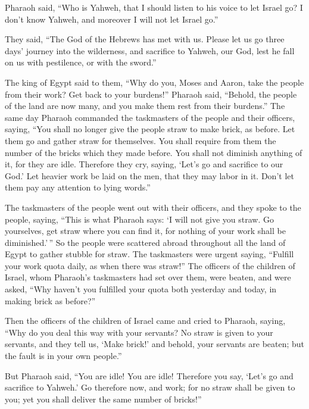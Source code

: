  Pharaoh said, ``Who is Yahweh, that I should listen to
his voice to let Israel go? I don't know Yahweh, and moreover I will not
let Israel go.''

 They said, ``The God of the Hebrews has met with us.
Please let us go three days' journey into the wilderness, and sacrifice
to Yahweh, our God, lest he fall on us with pestilence, or with the
sword.''

 The king of Egypt said to them, ``Why do you, Moses and
Aaron, take the people from their work? Get back to your burdens!''
 Pharaoh said, ``Behold, the people of the land are now
many, and you make them rest from their burdens.''  The
same day Pharaoh commanded the taskmasters of the people and their
officers, saying,  ``You shall no longer give the people
straw to make brick, as before. Let them go and gather straw for
themselves.  You shall require from them the number of the
bricks which they made before. You shall not diminish anything of it,
for they are idle. Therefore they cry, saying, `Let's go and sacrifice
to our God.'  Let heavier work be laid on the men, that
they may labor in it. Don't let them pay any attention to lying words.''

 The taskmasters of the people went out with their
officers, and they spoke to the people, saying, ``This is what Pharaoh
says: `I will not give you straw.  Go yourselves, get
straw where you can find it, for nothing of your work shall be
diminished.'\,''  So the people were scattered abroad
throughout all the land of Egypt to gather stubble for straw.
 The taskmasters were urgent saying, ``Fulfill your work
quota daily, as when there was straw!''  The officers of
the children of Israel, whom Pharaoh's taskmasters had set over them,
were beaten, and were asked, ``Why haven't you fulfilled your quota both
yesterday and today, in making brick as before?''

 Then the officers of the children of Israel came and
cried to Pharaoh, saying, ``Why do you deal this way with your servants?
 No straw is given to your servants, and they tell us,
`Make brick!' and behold, your servants are beaten; but the fault is in
your own people.''

 But Pharaoh said, ``You are idle! You are idle!
Therefore you say, `Let's go and sacrifice to Yahweh.' 
Go therefore now, and work; for no straw shall be given to you; yet you
shall deliver the same number of bricks!''

